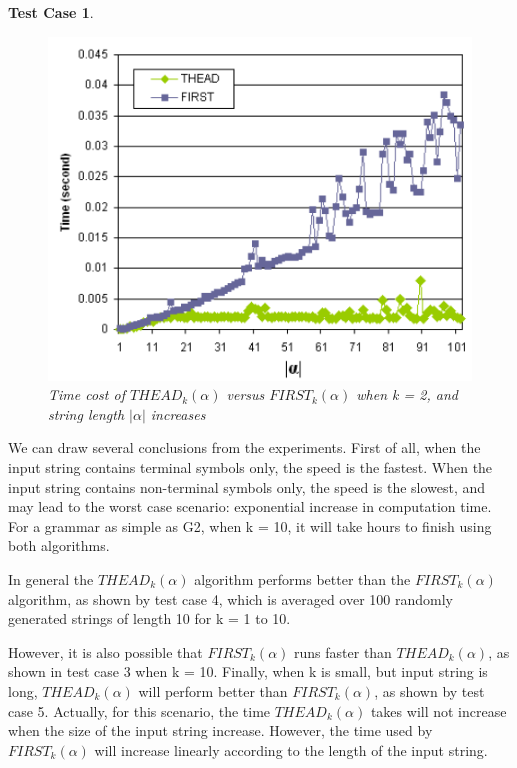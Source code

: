\documentclass{sig-alternate-05-2015}
\newtheorem{TestCase}{Test Case}
\begin{document}
\begin{TestCase}
\begin{figure}[h]
\centering
\includegraphics[scale=0.5]{figure6.PNG}
\caption{Time cost of $THEAD_k(\alpha)$ versus $FIRST_k(\alpha)$
when k = 2, and string length $|\alpha|$ increases}
\label{fig:6}
\end{figure}
\end{TestCase}


We can draw several conclusions from the experiments.
First of all, when the input string contains terminal symbols
only, the speed is the fastest. When the input string
contains non-terminal symbols only, the speed is the slowest,
and may lead to the worst case scenario: exponential
increase in computation time. For a grammar as simple as
G2, when k = 10, it will take hours to finish using both
algorithms.

In general the $THEAD_k(\alpha)$ algorithm performs better
than the $FIRST_k(\alpha)$ algorithm, as shown by test case 4,
which is averaged over 100 randomly generated strings of
length 10 for k = 1 to 10.

However, it is also possible that $FIRST_k(\alpha)$ runs faster
than $THEAD_k(\alpha)$, as shown in test case 3 when k = 10.
Finally, when k is small, but input string is long,
$THEAD_k(\alpha)$ will perform better than $FIRST_k(\alpha)$, as shown
by test case 5. Actually, for this scenario, the time
$THEAD_k(\alpha)$ takes will not increase when the size of the
input string increase. However, the time used by $FIRST_k(\alpha)$
will increase linearly according to the length of the input
string.
\end{document}

